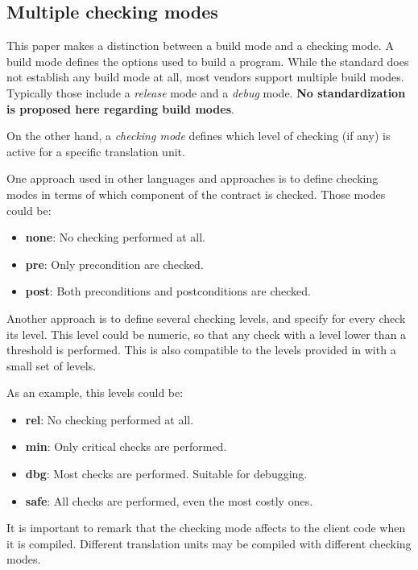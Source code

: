 \subsection{Multiple checking modes}

This paper makes a distinction between a build mode and a checking mode. A build
mode defines the options used to build a program. While the standard does not
establish any build mode at all, most vendors support multiple build modes.
Typically those include a \emph{release} mode and a \emph{debug} mode. \textbf{No
standardization is proposed here regarding build modes}.

On the other hand, a \emph{checking mode} defines which level of checking (if any) is
active for a specific translation unit.

One approach used in other languages and approaches is to define checking modes
in terms of which component of the contract is checked.
Those modes could be:

\begin{itemize}
  \item \textbf{none}: No checking performed at all.
  \item \textbf{pre}: Only precondition are checked.
  \item \textbf{post}: Both preconditions and postconditions are checked.
\end{itemize}

Another approach is to define several checking levels, and specify for every
check its level. This level could be numeric, so that any check with a level
lower than a threshold is performed. This is also compatible to the levels
provided in \cite{n4135} with a small set of levels. 

As an example, this levels could be:

\begin{itemize}
  \item \textbf{rel}: No checking performed at all.
  \item \textbf{min}: Only critical checks are performed.
  \item \textbf{dbg}: Most checks are performed. Suitable for debugging.
  \item \textbf{safe}: All checks are performed, even the most costly ones.
\end{itemize}

It is important to remark that the checking mode affects to the client code when
it is compiled. Different translation units may be compiled with different
checking modes.


